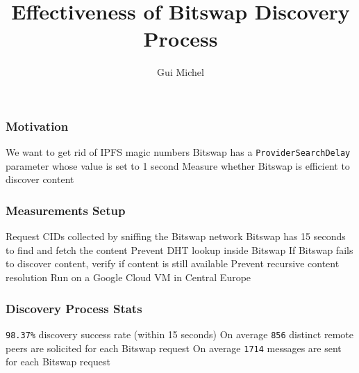 \documentclass{pl-slide}
\title{Effectiveness of Bitswap Discovery Process }
\author{Gui Michel}
\institute{Protocol Labs}
\date{\DTMdate{2022-12-15}}
\begin{document}
\frame{\titlepage}

\begin{frame}
\frametitle{Motivation}
\begin{itemize}
	\itemc We want to get rid of IPFS magic numbers
	\itemc Bitswap has a \texttt{ProviderSearchDelay} parameter whose value is set to 1 second
	\itemc Measure whether Bitswap is efficient to discover content

\end{itemize}
\end{frame}

\begin{frame}
\frametitle{Measurements Setup}
\begin{itemize}
	\itemc Request CIDs collected by sniffing the Bitswap network
	\itemc Bitswap has 15 seconds to find and fetch the content
	\itemc Prevent DHT lookup inside Bitswap
	\itemc If Bitswap fails to discover content, verify if content is still available
	\itemc Prevent recursive content resolution
	\itemc Run on a Google Cloud VM in Central Europe
\end{itemize}
\end{frame}

\begin{frame}
\frametitle{Discovery Process Stats}
\begin{itemize}
	\itemc \texttt{98.37\%} discovery success rate (within 15 seconds)
	\itemc On average \texttt{856} distinct remote peers are solicited for each Bitswap request
	\itemc On average \texttt{1714} messages are sent for each Bitswap request
\end{itemize}
\end{frame}
\end{document}
